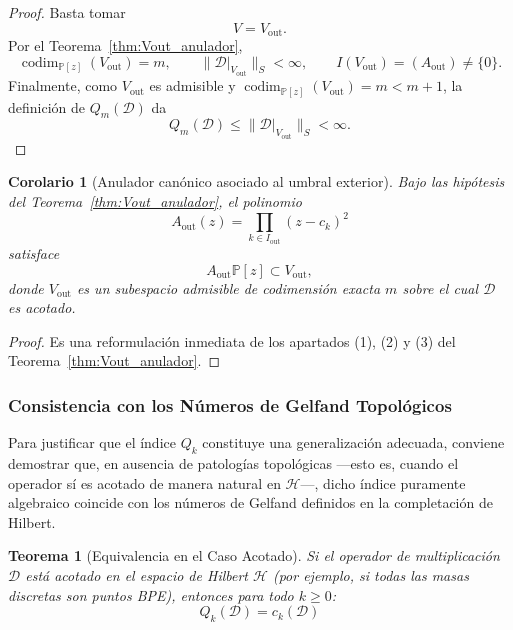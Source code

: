 \documentclass[12pt,a4paper]{article}
\newtheorem{theorem}{Teorema}
\newtheorem{corollary}{Corolario}
\theoremstyle{definition}
\theoremstyle{remark}
\newcommand{\Poly}{\mathbb{P}[z]}
\newcommand{\D}{\mathcal{D}}
\begin{document}
\begin{proof}
  Basta tomar
  \[
    V=V_{\mathrm{out}}.
  \]
  Por el Teorema~\ref{thm:Vout_anulador},
  \[
    \operatorname{codim}_{\Poly}(V_{\mathrm{out}})=m,
    \qquad
    \|\D|_{V_{\mathrm{out}}}\|_S<\infty,
    \qquad
    I(V_{\mathrm{out}})=(A_{\mathrm{out}})\neq\{0\}.
  \]
  Finalmente, como $V_{\mathrm{out}}$ es admisible y $\operatorname{codim}_{\Poly}(V_{\mathrm{out}})=m< m+1$,
  la definición de $Q_m(\D)$ da
  \[
    Q_m(\D)\le \|\D|_{V_{\mathrm{out}}}\|_S<\infty.
  \]
\end{proof}

\begin{corollary}[Anulador canónico asociado al umbral exterior]
  \label{cor:anulador_canonico_umbral}
  Bajo las hipótesis del Teorema~\ref{thm:Vout_anulador}, el polinomio
  \[
    A_{\mathrm{out}}(z)=\prod_{k\in I_{\mathrm{out}}}(z-c_k)^2
  \]
  satisface
  \[
    A_{\mathrm{out}}\Poly\subset V_{\mathrm{out}},
  \]
  donde $V_{\mathrm{out}}$ es un subespacio admisible de codimensión exacta $m$
  sobre el cual $\D$ es acotado.
\end{corollary}

\begin{proof}
  Es una reformulación inmediata de los apartados (1), (2) y (3) del
  Teorema~\ref{thm:Vout_anulador}.
\end{proof}



\subsubsection{Consistencia con los Números de Gelfand Topológicos}

Para justificar que el índice $Q_k$ constituye una generalización adecuada, conviene demostrar que, en ausencia de patologías topológicas ---esto es, cuando el operador sí es acotado de manera natural en $\mathcal{H}$---, dicho índice puramente algebraico coincide con los números de Gelfand definidos en la completación de Hilbert.

\begin{theorem}[Equivalencia en el Caso Acotado]\label{thm:equivalencia_Qk_Gelfand}
  Si el operador de multiplicación $\D$ está acotado en el espacio de Hilbert $\mathcal{H}$ (por ejemplo, si todas las masas discretas son puntos BPE), entonces para todo $k \ge 0$:
  $$ Q_k(\D) = c_k(\D) $$
\end{theorem}
\end{document}
